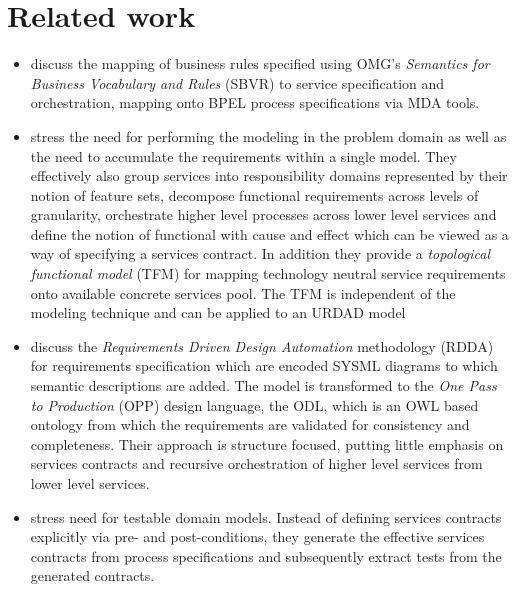 \section{Related work \label{sec:relatedWork}}

\begin{itemize}
 \item \cite{iacob_model-driven_2008} discuss the mapping of business rules specified using OMG's {\em Semantics for Business Vocabulary and Rules} (SBVR) to service specification and orchestration, mapping onto BPEL process specifications via MDA tools.

  \item \cite{asnina_computation_2010} stress the need for performing the modeling in the problem domain as well as the need to accumulate the requirements within a single model. They effectively also group services into responsibility domains represented by their notion of feature sets, decompose functional requirements across levels of granularity, orchestrate higher level processes across lower level services and define the notion of functional with cause and effect which can be viewed as a way of specifying a services contract. In addition they provide a {\em topological functional model} (TFM) for mapping technology neutral service requirements onto available concrete services pool. The TFM is independent of the modeling technique and can be applied to an URDAD model

  \item \cite{cardei_model_2008} discuss the {\em Requirements Driven Design Automation} methodology (RDDA) for requirements specification which are encoded SYSML diagrams to which semantic descriptions are added. The model is transformed to the {\em One Pass to Production} (OPP) design language, the ODL, which is an OWL based ontology from which the requirements are validated for consistency and completeness. Their approach is structure focused, putting little emphasis on services contracts and recursive orchestration of higher level services from lower level services.

  \item \cite{bashardoust-tajali_extracting_2008} stress need for testable domain models. Instead of defining services contracts explicitly via pre- and post-conditions, they generate the effective services contracts from process specifications and subsequently extract tests from the generated contracts.

\end{itemize}
